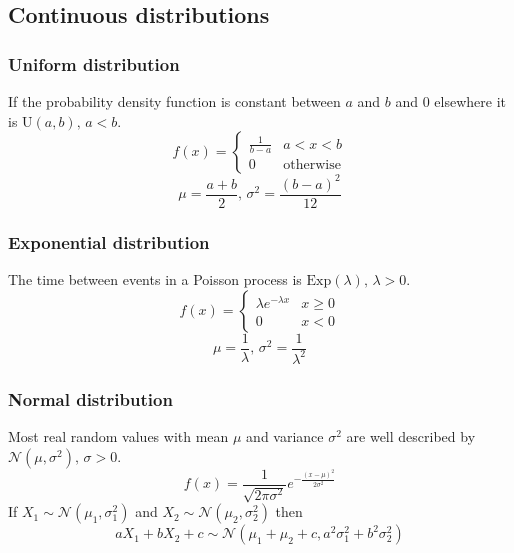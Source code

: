 \documentclass[
	a4paper,
	landscape,
	10pt,
]{article}
\begin{document}
\begin{multicols}{3}
\subsection{Continuous distributions}

\subsubsection*{Uniform distribution}
If the probability density function is constant between $a$ and $b$ and 0 elsewhere it is $\textrm{U}(a,b),\,a<b$.
\[f(x) = \left\{
\begin{array}{cl}
\frac{1}{b-a} & a<x<b\\
0 & \textrm{otherwise}
\end{array}\right.\]
\[\mu=\frac{a+b}{2},\,\sigma^2=\frac{(b-a)^2}{12}\]

\subsubsection*{Exponential distribution}
The time between events in a Poisson process is $\textrm{Exp}(\lambda),\,\lambda>0$.
\[f(x) = \left\{
\begin{array}{cl}
\lambda e^{-\lambda x} & x\geq0\\
0 & x<0
\end{array}\right.\]
\[\mu=\frac{1}{\lambda},\,\sigma^2=\frac{1}{\lambda^2}\]

\subsubsection*{Normal distribution}
Most real random values with mean $\mu$ and variance $\sigma^2$ are well described by $\mathcal{N}(\mu,\sigma^2),\,\sigma>0$.
\[ f(x) = \frac{1}{\sqrt{2\pi\sigma^2}}e^{-\frac{(x-\mu)^2}{2\sigma^2}} \]
If $X_1 \sim \mathcal{N}(\mu_1,\sigma_1^2)$ and $X_2 \sim \mathcal{N}(\mu_2,\sigma_2^2)$ then
\[ aX_1 + bX_2 + c \sim \mathcal{N}(\mu_1+\mu_2+c,a^2\sigma_1^2+b^2\sigma_2^2) \]

\end{multicols}
\end{document}
